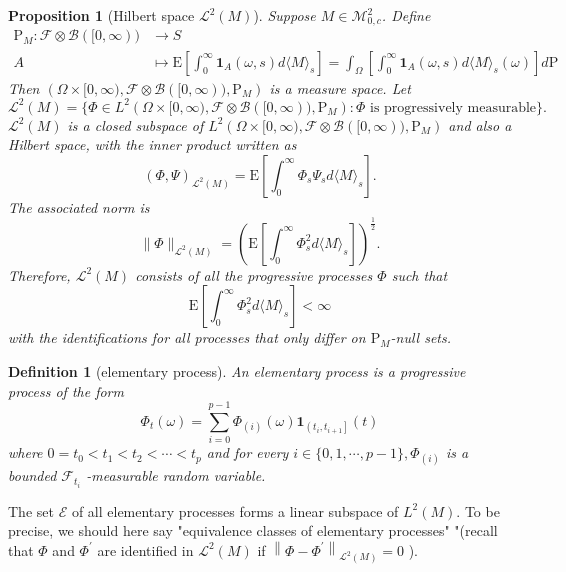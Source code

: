 \documentclass{report}
\newtheorem{definition}{Definition}[section]
\newtheorem{proposition}{Proposition}[section]
\theoremstyle{nonumberplain}
\begin{document}
\begin{proposition}[Hilbert space $\mathscr{L}^2(M)$]
	Suppose $M\in \mathscr{M}^2_{0,c}$. Define
	\begin{align*}
	\mathrm{P}_{M}: \mathcal{F} \otimes \mathcal{B}([0, \infty))&\longrightarrow S\\
	A&\longmapsto \mathrm{E}\left[\int_{0}^{\infty} \mathbf{1}_{A}(\omega, s) d\langle M\rangle_{s}\right]=\int_{\Omega}\left[\int_{0}^{\infty} \mathbf{1}_{A}(\omega, s) d\langle M\rangle_{s}(\omega)\right]d\mathrm{P}
	\end{align*}
	Then $\left( \Omega\times[0, \infty) ,  \mathcal{F}\otimes \mathcal{B}([0, \infty)), \mathrm{P}_{M}\right)$ is a measure space. Let 
	$$
	\mathscr{L}^2(M)=\{\Phi\in L^2\left( \Omega\times[0, \infty) ,\mathcal{F}\otimes \mathcal{B}([0, \infty)), \mathrm{P}_{M}\right):\Phi \text{ is progressively measurable}\}.
	$$
	$\mathscr{L}^2(M)$ is a closed subspace of $L^2\left( \Omega\times[0, \infty) ,\mathcal{F}\otimes \mathcal{B}([0, \infty)), \mathrm{P}_{M}\right)$ and also a Hilbert space, with the inner product written as
	\[
	(\Phi,\Psi)_{\mathscr{L}^2(M)}= \mathrm{E}\left[\int_{0}^{\infty} \Phi_s\Psi_s d\langle M\rangle_{s}\right].
	\]
	The associated norm is
	\[
	\|\Phi\|_{\mathscr{L}^2(M)}=\left(\mathrm{E}\left[\int_{0}^{\infty} \Phi_{s}^{2} d\langle M\rangle_{s}\right]\right)^{\tfrac{1}{2}}.
	\]
	Therefore, $\mathscr{L}^2(M)$ consists of all the progressive processes $\Phi$ such that
	\[
	\mathrm{E}\left[\int_{0}^{\infty} \Phi_{s}^{2} d\langle M\rangle_{s}\right]<\infty
	\]
	with the identifications for all processes that only differ on $\mathrm{P}_M$-null sets.
\end{proposition}

\begin{definition}[elementary process]
An elementary process is a progressive process of the form
\[
\Phi_{t}(\omega)=\sum_{i=0}^{p-1} \Phi_{(i)}(\omega) \mathbf{1}_{\left(t_{i}, t_{i+1}\right]}(t)
\]
where $0=t_{0}<t_{1}<t_{2}<\cdots<t_{p}$ and for every $i \in\{0,1, \cdots, p-1\}, \Phi_{(i)}$ is a
bounded $\mathscr{F}_{t_{i}}$ -measurable random variable.
\end{definition}

The set $\mathscr{E}$ of all elementary processes forms a linear subspace of $L^{2}(M) .$ To be precise, we should here say "equivalence classes of elementary processes" "(recall that $\Phi$ and $\Phi^{\prime}$ are identified in $\mathscr{L}^{2}(M)$ if $\left\|\Phi-\Phi^{\prime}\right\|_{\mathscr{L}^{2}(M)}=0$ ).
\end{document}
